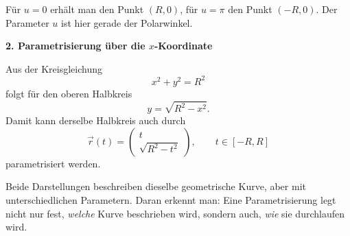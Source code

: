 Für \(u=0\) erhält man den Punkt \((R,0)\), für \(u=\pi\)
 den Punkt \((-R,0)\).
Der Parameter \(u\) ist hier gerade der Polarwinkel.

\medskip

\textbf{2. Parametrisierung über die \(x\)-Koordinate}

Aus der Kreisgleichung
\[
x^2+y^2=R^2
\]
folgt für den oberen Halbkreis
\[
y=\sqrt{R^2-x^2}.
\]
Damit kann derselbe Halbkreis auch durch
\[
\vec r(t)=
\begin{pmatrix}
	t\\
	\sqrt{R^2-t^2}
\end{pmatrix},
\qquad t\in[-R,R]
\]
parametrisiert werden.

\medskip

Beide Darstellungen beschreiben dieselbe geometrische Kurve, aber mit unterschiedlichen Parametern.
Daran erkennt man: Eine Parametrisierung legt nicht nur fest, \emph{welche} Kurve beschrieben wird, sondern auch, \emph{wie} sie durchlaufen wird.

